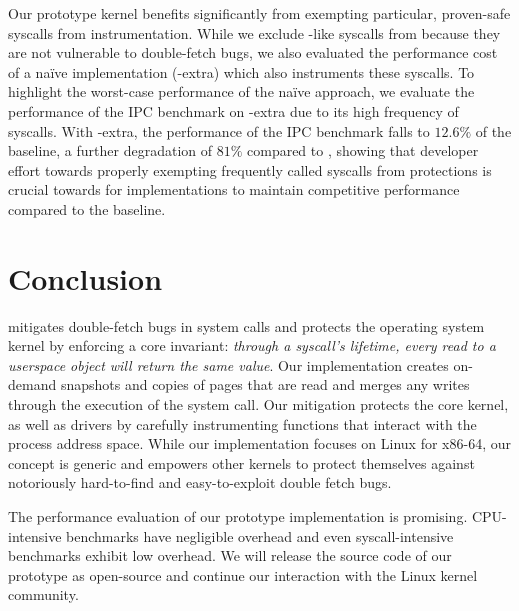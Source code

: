 \documentclass[letterpaper,twocolumn,10pt, anonymous]{article}
\begin{document}
Our prototype \tiktok kernel benefits significantly from 
exempting particular, proven-safe syscalls from instrumentation.
While we exclude -like syscalls from \tiktok because they 
are not vulnerable to double-fetch bugs, we also evaluated the
performance cost of a na\"ive implementation (\tiktok-extra)
which also instruments these syscalls.
To highlight the worst-case performance of the na\"ive approach, we 
evaluate the performance of the IPC benchmark on \tiktok-extra due 
to its high frequency of  syscalls.
With \tiktok-extra, the performance of the IPC benchmark falls to 
$12.6\%$ of the baseline, a further degradation of $81\%$ compared 
to \tiktok, showing that developer effort towards properly exempting 
frequently called syscalls from \tiktok protections is crucial
towards for implementations to maintain competitive performance
compared to the baseline.

\section{Conclusion}

\tiktok mitigates double-fetch bugs in system calls and protects the operating
system kernel by enforcing a core invariant:  \emph{through a syscall's
lifetime, every read to a userspace object will return the same value}.
Our \tiktok implementation creates on-demand snapshots and copies of pages that
are read and merges any writes through the execution of the system call.
%
Our mitigation protects the core kernel, as well as drivers by carefully
instrumenting functions that interact with the process address space. While our
implementation focuses on Linux for x86-64, our concept is generic and empowers
other kernels to protect themselves against notoriously hard-to-find and
easy-to-exploit double fetch bugs.

The performance evaluation of our prototype implementation is promising.
CPU-intensive benchmarks have negligible overhead and even syscall-intensive
benchmarks exhibit low overhead. We will release the source code of our
prototype as open-source and continue our interaction with the Linux kernel
community.




\end{document}
